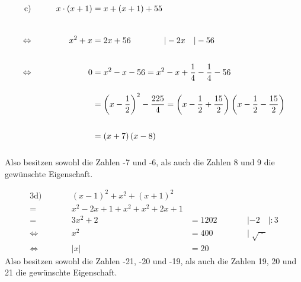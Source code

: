 \begin{exercise}
    \newcommand{\vstrut}{\text{\rule[-3.5ex]{0pt}{8ex}}}%
    \begin{alignat*}{2}
            \text{c)}&\vstrut\qquad & x\cdot(x+1)&=x+(x+1)+55                                                                     \\
      \Leftrightarrow&\vstrut\qquad &       x^2+x&=2x+56\qquad\qquad|-2x\quad|-56                                                 \\
      \Leftrightarrow&\vstrut\qquad &           0&=x^2-x-56
                                                  =x^2-x+\frac{1}{4}-\frac{1}{4}-56                                               \\
                     &\vstrut\qquad &            &=\left(x-\frac{1}{2}\right)^2-\frac{225}{4}
                                                  =\left(x-\frac{1}{2}+\frac{15}{2}\right)\left(x-\frac{1}{2}-\frac{15}{2}\right) \\
                     &\vstrut\qquad &            &=\left(x+7\right)\left(x-8\right)
    \end{alignat*}
    Also besitzen sowohl die Zahlen -7 und -6, als auch
    die Zahlen 8 und 9 die gewünschte Eigenschaft.

    \begin{alignat*}{3}
            \text{d)}&\qquad &   (x-1)^2+x^2+(x+1)^2&      & \qquad&                    \\[2ex]
                    =&\qquad & x^2-2x+1+x^2+x^2+2x+1&      & \qquad&                    \\[2ex]
                    =&\qquad &                3x^2+2&=1202 & \qquad&|-2\quad|:3         \\[2ex]
      \Leftrightarrow&\qquad &                 x^2  &=400  & \qquad&|\;\sqrt{\;\cdot\;} \\[2ex]
      \Leftrightarrow&\qquad &        \vert x\vert  &=20   & \qquad&
    \end{alignat*}
    Also besitzen sowohl die Zahlen -21, -20 und -19, als auch
    die Zahlen 19, 20 und 21 die gewünschte Eigenschaft.
  \fi
\end{exercise}
